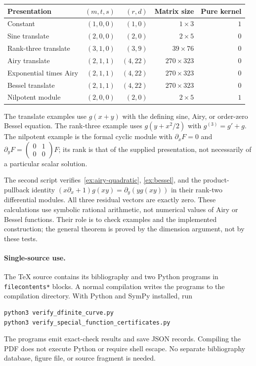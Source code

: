 \begin{center}
\small
\begin{tabular}{@{}lrrrr@{}}
\toprule
Presentation & $(m,t,s)$ & $(r,d)$ & Matrix size & Pure kernel\\
\midrule
Constant & $(1,0,0)$ & $(1,0)$ & $1\times3$ & $1$\\
Sine translate & $(2,0,0)$ & $(2,0)$ & $2\times5$ & $0$\\
Rank-three translate & $(3,1,0)$ & $(3,9)$ & $39\times76$ & $0$\\
Airy translate & $(2,1,1)$ & $(4,22)$ & $270\times323$ & $0$\\
Exponential times Airy & $(2,1,1)$ & $(4,22)$ & $270\times323$ & $0$\\
Bessel translate & $(2,1,1)$ & $(4,22)$ & $270\times323$ & $0$\\
Nilpotent module & $(2,0,0)$ & $(2,0)$ & $2\times5$ & $1$\\
\bottomrule
\end{tabular}
\end{center}

The translate examples use $g(x+y)$ with the defining sine, Airy, or
order-zero Bessel equation. The rank-three example uses
$g(y+x^2/2)$ with $g^{(3)}=g'+g$. The nilpotent example is the formal cyclic
module with $\partial_xF=0$ and
$\partial_yF=\left(\begin{smallmatrix}0&1\\0&0\end{smallmatrix}\right)F$;
its rank is that of the supplied presentation, not necessarily of a
particular scalar solution.

The second script verifies~\eqref{ex:airy-quadratic},
\eqref{ex:bessel}, and the product-pullback identity
$(x\partial_x+1)g(xy)=\partial_y(yg(xy))$ in their rank-two differential
modules. All three residual vectors are exactly zero. These calculations
use symbolic rational arithmetic, not numerical values of Airy or Bessel
functions. Their role is to check examples and the implemented construction;
the general theorem is proved by the dimension argument, not by these tests.

\paragraph{Single-source use.}
The TeX source contains its bibliography and two Python programs in
\texttt{filecontents*} blocks. A normal compilation writes the programs
to the compilation directory. With Python and SymPy installed, run
\begin{verbatim}
python3 verify_dfinite_curve.py
python3 verify_special_function_certificates.py
\end{verbatim}
The programs emit exact-check results and save JSON records. Compiling
the PDF does not execute Python or require shell escape. No separate
bibliography database, figure file, or source fragment is needed.

